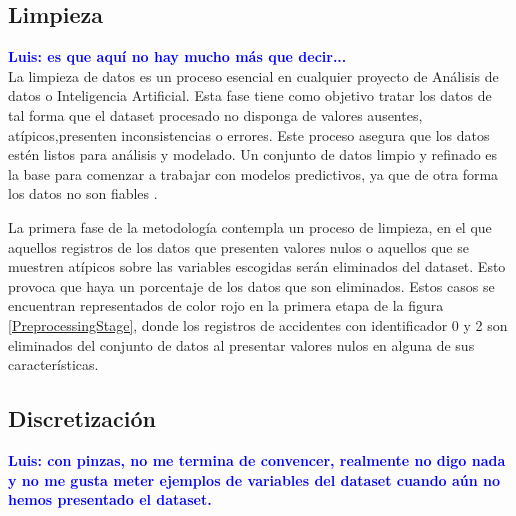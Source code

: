 \documentclass{uathesis-es}
\begin{document}
\subsection{Limpieza}

\textcolor{blue}{\textbf{Luis: es que aquí no hay mucho más que decir...}}\\

La limpieza de datos es un proceso esencial en cualquier proyecto de Análisis de datos o Inteligencia Artificial. Esta fase tiene como objetivo tratar los datos de tal forma que el dataset procesado no disponga de valores ausentes, atípicos,presenten inconsistencias o errores. Este proceso asegura que los datos estén listos para análisis y modelado. Un conjunto de datos limpio y refinado es la base para comenzar a trabajar con modelos predictivos, ya que de otra forma los datos no son fiables \cite{ilyas2019data}.


La primera fase de la metodología contempla un proceso de limpieza, en el que aquellos registros de los datos que presenten valores nulos o aquellos que se muestren atípicos sobre las variables escogidas serán eliminados del dataset. Esto provoca que haya un porcentaje de los datos que son eliminados. Estos casos se encuentran representados de color rojo en la primera etapa de la figura \ref{PreprocessingStage}, donde los registros de accidentes con identificador 0 y 2 son eliminados del conjunto de datos al presentar valores nulos en alguna de sus características.

\subsection{Discretización}


\textcolor{blue}{\textbf{Luis: con pinzas, no me termina de convencer, realmente no digo nada y no me gusta meter ejemplos de variables del dataset cuando aún no hemos presentado el dataset.}}\\
\end{document}
